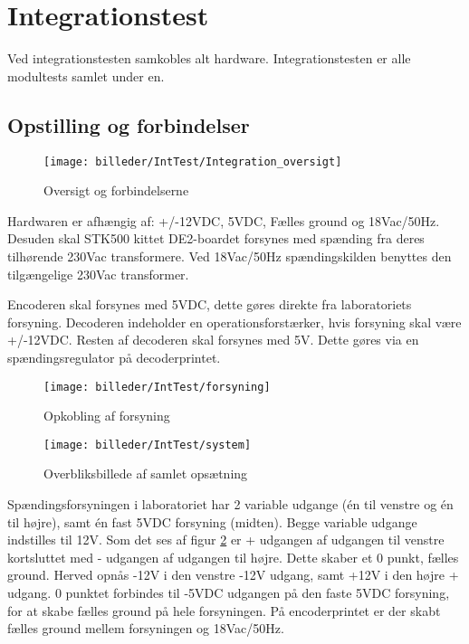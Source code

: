\section{Integrationstest}
Ved integrationstesten samkobles alt hardware. Integrationstesten er alle modultests samlet under en. 

\subsection{Opstilling og forbindelser}

\begin{figure}[H]
	\centering
	\texttt{[image: billeder/IntTest/Integration\_oversigt]}
	\caption{Oversigt og forbindelserne}
	\label{fig:integration_oversigt}
\end{figure}

Hardwaren er afhængig af: +/-12VDC, 5VDC, Fælles ground og 18Vac/50Hz. Desuden skal STK500 kittet DE2-boardet forsynes med spænding fra deres tilhørende 230Vac transformere. Ved 18Vac/50Hz spændingskilden benyttes den tilgængelige 230Vac transformer. 

Encoderen skal forsynes med 5VDC, dette gøres direkte fra laboratoriets forsyning.
Decoderen indeholder en operationsforstærker, hvis forsyning skal være +/-12VDC. Resten af decoderen skal forsynes med 5V. Dette gøres via en spændingsregulator på decoderprintet.   

\begin{figure}[H]
	\centering
	\texttt{[image: billeder/IntTest/forsyning]}
	\caption{Opkobling af forsyning}
    \label{fig:opkobling_forsyning}
\end{figure}

\begin{figure}[H]
	\centering
	\texttt{[image: billeder/IntTest/system]}
	\caption{Overbliksbillede af samlet opsætning}
    \label{fig:system_sammensat}
\end{figure}

Spændingsforsyningen i laboratoriet har 2 variable udgange (én til venstre og én til højre), samt én fast 5VDC forsyning (midten). Begge variable udgange indstilles til 12V. 
Som det ses af figur \ref{fig:opkobling_forsyning} er + udgangen af udgangen til venstre kortsluttet med - udgangen af udgangen til højre. Dette skaber et 0 punkt, fælles ground. Herved opnås -12V i den venstre -12V udgang, samt +12V i den højre + udgang. 0 punktet forbindes til -5VDC udgangen på den faste 5VDC forsyning, for at skabe fælles ground på hele forsyningen. På encoderprintet er der skabt fælles ground mellem forsyningen og 18Vac/50Hz.

